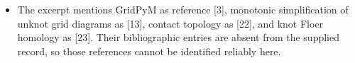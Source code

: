 \documentclass[11pt]{article}
\begin{document}
\begin{itemize}
\item The excerpt mentions GridPyM as reference [3], monotonic simplification of unknot grid diagrams as [13], contact topology as [22], and knot Floer homology as [23]. Their bibliographic entries are absent from the supplied record, so those references cannot be identified reliably here.
\end{itemize}
\end{document}
